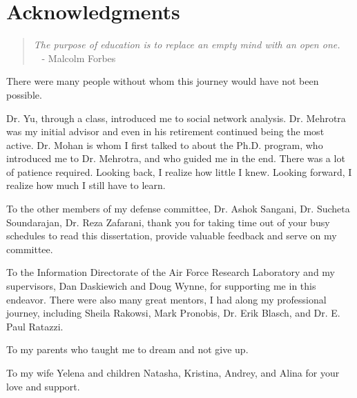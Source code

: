 \section*{Acknowledgments}
\setlength{\parskip}{.14 in}
\begin{quote}
\emph{The purpose of education is to replace an empty mind with an open one.}\\
\mbox{}~ \hfill{} {\footnotesize -  Malcolm Forbes}
\end{quote}
\noindent There were many people without whom this journey would have not been possible.

\noindent Dr. Yu, through a class, introduced me to social network analysis. Dr. Mehrotra was my initial advisor and even in his retirement continued being the most active. Dr. Mohan is whom I first talked to about the Ph.D. program, who introduced me to Dr. Mehrotra, and who guided me in the end. There was a lot of patience required. Looking back, I realize how little I knew. Looking forward, I realize how much I still have to learn.

\noindent To the other members of my defense committee, Dr. Ashok Sangani, Dr. Sucheta Soundarajan, Dr. Reza Zafarani, thank you for taking time out of your busy schedules to read this dissertation, provide valuable feedback and serve on my committee.

\noindent To the Information Directorate of the Air Force Research Laboratory and my supervisors, Dan Daskiewich and Doug Wynne, for supporting me in this endeavor. There were also many great mentors, I had along my professional journey, including Sheila Rakowsi, Mark Pronobis, Dr. Erik Blasch, and Dr. E. Paul Ratazzi.

\noindent To my parents who taught me to dream and not give up.

\noindent To my wife Yelena and children Natasha, Kristina, Andrey, and Alina for your love and support.